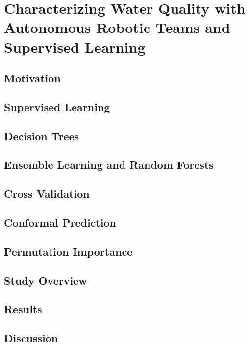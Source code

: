 \chapter{Characterizing Water Quality with Autonomous Robotic Teams and Supervised Learning}\label{ch:robot-team-supervised}


\section{Motivation}

\section{Supervised Learning}

\section{Decision Trees}

\section{Ensemble Learning and Random Forests}

\section{Cross Validation}

\section{Conformal Prediction}

\section{Permutation Importance}

\section{Study Overview}

\section{Results}

\section{Discussion}


